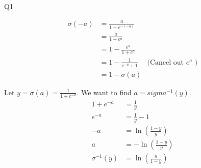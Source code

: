 \question Q1\droppoints

\begin{solution}

    \[
        \begin{align*}
            \sigma(-a)
            &= \frac{a}{1 + e^{-(-a)}} & \\
            &= \frac{a}{1 + e^a} & \\
            &= 1 - \frac{e^a}{1 + e^a} & \\
            &= 1 - \frac{1}{e^{-a} + 1} & \text{(Cancel out } e^a \text{ )} \\
            &= 1 - \sigma(a)
        \end{align*}
    \]

     Let $y = \sigma(a) = \frac{1}{1 + e^{-a}}$.
    We want to find $a = sigma^{-1}(y)$.
    \[
        \begin{align*}
            1 + e^{-a} &= \frac{1}{y} \\
            e^{-a} &= \frac{1}{y} - 1 \\
            -a &= \ln{\left(\frac{1 - y}{y}\right)} \\
            a &= -\ln{\left(\frac{1 - y}{y}\right)} \\
            \sigma^{-1}(y) &= \ln{\left(\frac{y}{1 - y}\right)}
        \end{align*}
    \]
\end{solution}
